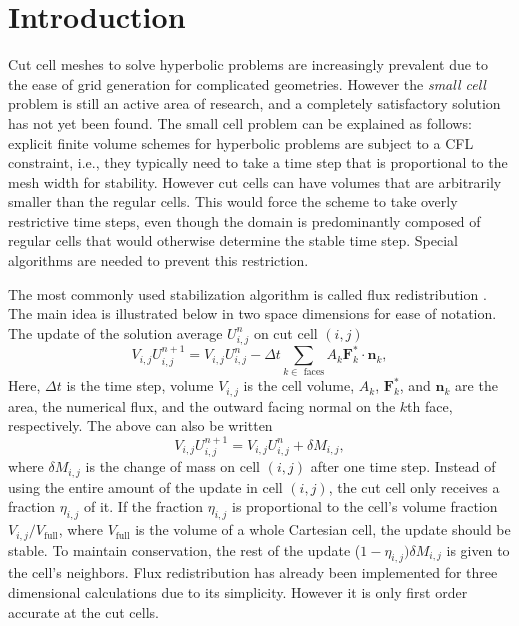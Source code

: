 \section{Introduction}\label{sec:intro}
Cut cell meshes to solve hyperbolic problems 
are increasingly prevalent due to the ease 
of grid generation for complicated geometries. 
However the {\em small cell} problem is still an active area of research, and
a completely satisfactory solution has not yet been found.
The small cell problem can be explained as follows: explicit
finite volume schemes for hyperbolic problems are subject to a CFL constraint, i.e.,  they typically need to take a time step that is proportional to the mesh width for
stability. However cut cells can have volumes that are arbitrarily smaller than the regular cells.  This would force the scheme to take overly restrictive time steps, even though the domain is predominantly composed of regular cells that would otherwise determine the stable time step. Special algorithms are needed to prevent this restriction.

The most commonly used stabilization algorithm is called flux
redistribution \cite{chern:colella,vof:colella}. The main idea is illustrated below in two space
dimensions for ease of notation.
The update of the solution average 
$U^n_{i,j}$ on cut cell $(i,j)$ 
\begin{equation*}
V_{i,j} U_{i,j} ^{n+1}  = V_{i,j} U_{i,j}^n  -  \Delta t \sum_{k \in \text{ faces}}A_k \mathbf{F}_k^* \cdot \mathbf{n}_k,
\end{equation*}
Here, $\Delta t$ is the time step,
volume $V_{i,j}$ is the cell volume,
$A_k$, $\mathbf{F}_k^*$, and $\mathbf{n}_k$ are the area, the numerical flux, and the outward facing normal on the $k$th face, respectively.
The above can also be written
\begin{equation*}
V_{i,j} U_{i,j} ^{n+1} = V_{i,j} U_{i,j}^n  +  \delta  M_{i,j} ,
\end{equation*}
where $\delta M_{i,j}$ is the change of mass on cell $(i,j)$ after one time step.
Instead of using the entire amount of the update in cell $(i,j)$, 
the cut cell only receives a fraction $\eta_{i,j}$ of it.  If the fraction $\eta_{i,j}$
is proportional to the cell's volume fraction $V_{i,j}/V_{\text{full}}$, where $V_{\text{full}}$ is the volume of a whole Cartesian cell, the update should be stable. 
To maintain conservation, the rest of the update ($1-\eta_{i,j})\delta M_{i,j}$
is given to the cell's neighbors.  
Flux redistribution has already been implemented for three dimensional
calculations due to its simplicity. However it is only first order accurate at the cut cells.

